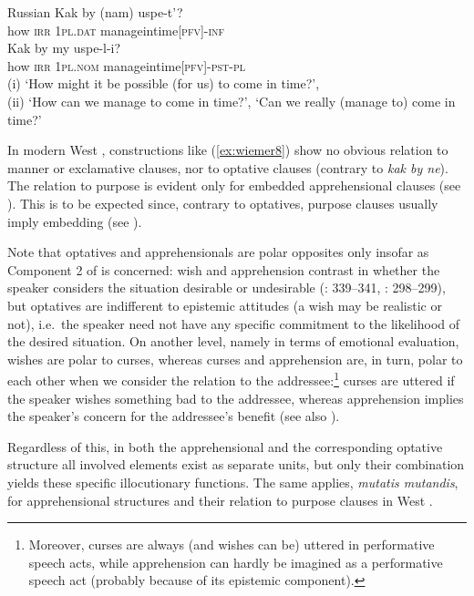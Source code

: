 \documentclass[output=paper,colorlinks,citecolor=brown]{langscibook}
\begin{document}
\ea \textnormal{Russian}
\label{ex:wiemer10} 
\ea \label{ex:wiemer10a}
\gll Kak by (nam) uspe-t'? \\
how \textsc{irr} \textsc{1pl.dat} manage\textunderscore in\textunderscore time\textsc{[pfv]-inf} \\
\ex \label{ex:wiemer10b}
\gll Kak by my uspe-l-i? \\
how \textsc{irr} \textsc{1pl.nom} manage\textunderscore in\textunderscore time\textsc{[pfv]-pst-pl}\\
\glt (i) `How might it be possible (for us) to come in time?', \\
(ii) `How can we manage to come in time?', `Can we really (manage to) come in time?'
\z
\z


 In modern West , constructions like (\ref{ex:wiemer8}) show no obvious relation to manner or exclamative clauses, nor to optative clauses (contrary to  \textit{kak by ne}). The relation to purpose is evident only for embedded apprehensional clauses (see ). This is to be expected since, contrary to optatives, purpose clauses usually imply embedding (see ).

Note that optatives and apprehensionals are polar opposites only insofar as Component 2 of  is concerned: wish and apprehension contrast in whether the speaker considers the situation desirable or undesirable (\citealt{Dobrushina2016}: 339--341, \citealt{Wiemer2017}: 298--299), but optatives are indifferent to epistemic attitudes (a wish may be realistic or not), i.e.\ the speaker need not have any specific commitment to the likelihood of the desired situation. On another level, namely in terms of emotional evaluation, wishes are polar to curses, whereas curses and apprehension are, in turn, polar to each other when we consider the relation to the addressee:\footnote{Moreover, curses are always (and wishes can be) uttered in performative speech acts, while apprehension can hardly be imagined as a performative speech act (probably because of its epistemic component).} curses are uttered if the speaker wishes something bad to the addressee, whereas apprehension implies the speaker's concern for the addressee's benefit (see also ).


Regardless of this, in both the apprehensional and the corresponding optative structure all involved elements exist as separate units, but only their combination yields these specific illocutionary functions. The same applies, \textit{mutatis mutandis}, for apprehensional structures and their relation to purpose clauses in West .
\end{document}
